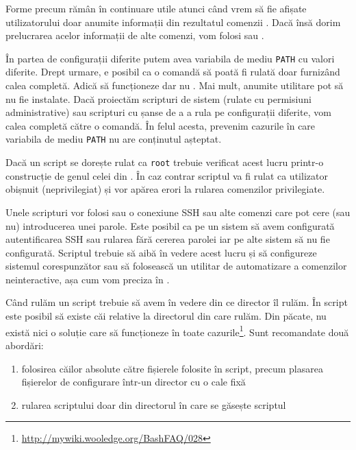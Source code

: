 Forme precum  rămân în continuare utile atunci când vrem să fie afișate utilizatorului doar anumite informații din rezultatul comenzii .
Dacă însă dorim prelucrarea acelor informații de alte comenzi, vom folosi  sau .

În partea de configurații diferite putem avea variabila de mediu \texttt{PATH} cu valori diferite.
Drept urmare, e posibil ca o comandă să poată fi rulată doar furnizând calea completă.
Adică să funcționeze  dar nu .
Mai mult, anumite utilitare pot să nu fie instalate.
Dacă proiectăm scripturi de sistem (rulate cu permisiuni administrative) sau scripturi cu șanse de a a rula pe configurații diferite, vom calea completă către o comandă.
În felul acesta, prevenim cazurile în care variabila de mediu \texttt{PATH} nu are conținutul așteptat.

Dacă un script se dorește rulat ca \texttt{root} trebuie verificat acest lucru printr-o construcție de genul celei din .
În caz contrar scriptul va fi rulat ca utilizator obișnuit (neprivilegiat) și vor apărea erori la rularea comenzilor privilegiate.


Unele scripturi vor folosi  sau o conexiune SSH sau alte comenzi care pot cere (sau nu) introducerea unei parole.
Este posibil ca pe un sistem să avem configurată autentificarea SSH sau rularea  fără cererea parolei iar pe alte sistem să nu fie configurată.
Scriptul trebuie să aibă în vedere acest lucru și să configureze sistemul corespunzător sau să folosească un utilitar de automatizare a comenzilor neinteractive, așa cum vom preciza în .

Când rulăm un script trebuie să avem în vedere din ce director îl rulăm.
În script este posibil să existe căi relative la directorul din care rulăm.
Din păcate, nu există nici o soluție care să funcționeze în toate cazurile\footnote{\url{http://mywiki.wooledge.org/BashFAQ/028}}.
Sunt recomandate două abordări:
\begin{enumerate}
  \item folosirea căilor absolute către fișierele folosite în script, precum plasarea fișierelor de configurare într-un director cu o cale fixă
  \item rularea scriptului doar din directorul în care se găsește scriptul
\end{enumerate}

